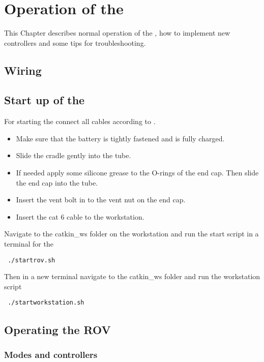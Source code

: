 \chapter{Operation of the \abbrROV} \label{app:operation}
This Chapter describes normal operation of the \abbrROV, how to implement new controllers and some tips for troubleshooting.

\section{Wiring} \label{sec_wiring}
\section{Start up of the \abbrROV}
For starting the \abbrROV connect all cables according to .
\begin{itemize}
	\item Make sure that the battery is tightly fastened and is fully charged. 
	\item Slide the cradle gently into the \abbrROV tube. 
	\item If needed apply some silicone grease to the O-rings of the end cap. Then slide the end cap into the \abbrROV tube.
	\item Insert the vent bolt in to the vent nut on the end cap.
	\item Insert the cat 6 cable to the workstation.
 \end{itemize} 
Navigate to the catkin\_ws folder on the workstation and run the start script in a terminal for the \abbrROV
\begin{lstlisting}
 ./startrov.sh
\end{lstlisting}
Then in a new terminal navigate to the catkin\_ws folder and run the workstation script
\begin{lstlisting}
 ./startworkstation.sh
\end{lstlisting} 
\section{Operating the ROV}

\subsection{Modes and controllers}

